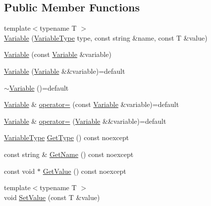 \subsection*{Public Member Functions}
\begin{DoxyCompactItemize}
\item 
{\footnotesize template$<$typename T $>$ }\\\hyperlink{structmage_1_1_variable_a2891c12cc750548de92380489f3a9f49}{Variable} (\hyperlink{namespacemage_a530428e73bac0ba7fe84b29086a9e33a}{Variable\+Type} type, const string \&name, const T \&value)
\item 
\hyperlink{structmage_1_1_variable_a778d347a0d63771cbaac45bcba594792}{Variable} (const \hyperlink{structmage_1_1_variable}{Variable} \&variable)
\item 
\hyperlink{structmage_1_1_variable_a49764740130a9b06033869fff0b634a9}{Variable} (\hyperlink{structmage_1_1_variable}{Variable} \&\&variable)=default
\item 
\hyperlink{structmage_1_1_variable_a7503f010f296683cecf9be65a3f86589}{$\sim$\+Variable} ()=default
\item 
\hyperlink{structmage_1_1_variable}{Variable} \& \hyperlink{structmage_1_1_variable_a461893d21d4a48a548b1df5a89c58793}{operator=} (const \hyperlink{structmage_1_1_variable}{Variable} \&variable)=default
\item 
\hyperlink{structmage_1_1_variable}{Variable} \& \hyperlink{structmage_1_1_variable_aec9505fabbafb48e9fcbf9d9213147ce}{operator=} (\hyperlink{structmage_1_1_variable}{Variable} \&\&variable)=default
\item 
\hyperlink{namespacemage_a530428e73bac0ba7fe84b29086a9e33a}{Variable\+Type} \hyperlink{structmage_1_1_variable_a7a08695051144936e1bdf1c762c148d7}{Get\+Type} () const noexcept
\item 
const string \& \hyperlink{structmage_1_1_variable_a23003aa97e07342b201068a041571d77}{Get\+Name} () const noexcept
\item 
const void $\ast$ \hyperlink{structmage_1_1_variable_a2ca2f704f2234425bbc751bc76a16ca5}{Get\+Value} () const noexcept
\item 
{\footnotesize template$<$typename T $>$ }\\void \hyperlink{structmage_1_1_variable_ab3b2bfdc631a8174c9a5c0360a4fee30}{Set\+Value} (const T \&value)
\end{DoxyCompactItemize}
